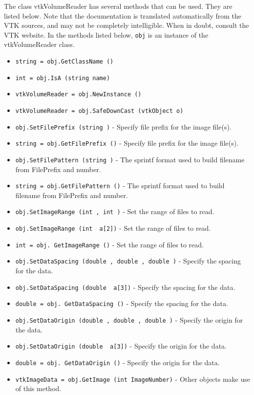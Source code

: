 The class vtkVolumeReader has several methods that can be used.
  They are listed below.
Note that the documentation is translated automatically from the VTK sources,
and may not be completely intelligible.  When in doubt, consult the VTK website.
In the methods listed below, \verb|obj| is an instance of the vtkVolumeReader class.
\begin{itemize}
\item  \verb|string = obj.GetClassName ()|

\item  \verb|int = obj.IsA (string name)|

\item  \verb|vtkVolumeReader = obj.NewInstance ()|

\item  \verb|vtkVolumeReader = obj.SafeDownCast (vtkObject o)|

\item  \verb|obj.SetFilePrefix (string )| -  Specify file prefix for the image file(s).

\item  \verb|string = obj.GetFilePrefix ()| -  Specify file prefix for the image file(s).

\item  \verb|obj.SetFilePattern (string )| -  The sprintf format used to build filename from FilePrefix and number.

\item  \verb|string = obj.GetFilePattern ()| -  The sprintf format used to build filename from FilePrefix and number.

\item  \verb|obj.SetImageRange (int , int )| -  Set the range of files to read.

\item  \verb|obj.SetImageRange (int  a[2])| -  Set the range of files to read.

\item  \verb|int = obj. GetImageRange ()| -  Set the range of files to read.

\item  \verb|obj.SetDataSpacing (double , double , double )| -  Specify the spacing for the data.

\item  \verb|obj.SetDataSpacing (double  a[3])| -  Specify the spacing for the data.

\item  \verb|double = obj. GetDataSpacing ()| -  Specify the spacing for the data.

\item  \verb|obj.SetDataOrigin (double , double , double )| -  Specify the origin for the data.

\item  \verb|obj.SetDataOrigin (double  a[3])| -  Specify the origin for the data.

\item  \verb|double = obj. GetDataOrigin ()| -  Specify the origin for the data.

\item  \verb|vtkImageData = obj.GetImage (int ImageNumber)| -  Other objects make use of this method.

\end{itemize}
